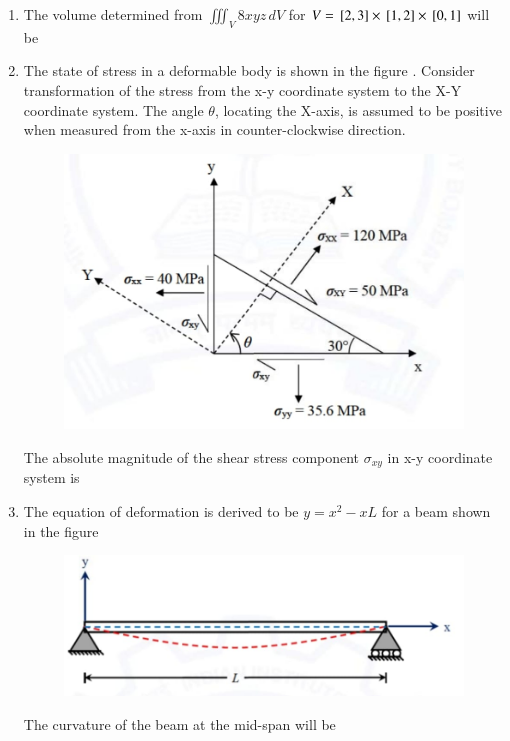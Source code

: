 \documentclass[journal,12pt,onecolumn]{article}
\theoremstyle{remark}
\begin{document}
\begin{enumerate}
\hfill{}

\item The volume determined from $\iiint_V 8xyz \,dV$ for $V = {}\left[2, 3\right] \times {}\left[1, 2\right] \times {}\left[0, 1\right]$ will be  \underline{\hspace{2cm}}

\hfill{}

\item The state of stress in a deformable body is shown in the figure . Consider transformation of the stress from the x-y coordinate system to the X-Y coordinate system. The angle $\theta$, locating the X-axis, is assumed to be positive when measured from the x-axis in counter-clockwise direction.
\begin{figure}[H]
    \centering
    \includegraphics[width=0.7\columnwidth]{figs/1q20.jpg}
    \caption{}
    \label{fig:q20}
\end{figure}
The absolute magnitude of the shear stress component $\sigma_{xy}$  in x-y coordinate system is \underline{\hspace{2cm}}

\hfill{}

\item The equation of deformation is derived to be $y = x^2-xL$ for a beam shown in the figure 
\begin{figure}[H]
    \centering
    \includegraphics[width=0.7\columnwidth]{figs/1q21.jpg}
    \caption{}
    \label{fig:q21}
\end{figure}
The curvature of the beam at the mid-span  will be \underline{\hspace{2cm}}


\end{enumerate}
\end{document}

